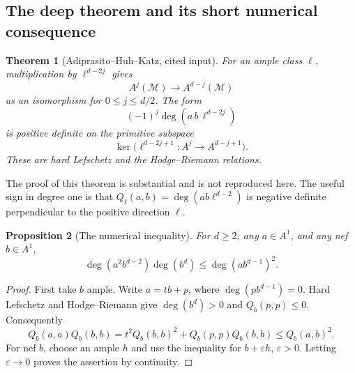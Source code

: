 \documentclass[11pt]{article}
\newtheorem{theorem}{Theorem}[section]
\newtheorem{proposition}[theorem]{Proposition}
\theoremstyle{definition}
\theoremstyle{remark}
\begin{document}
\subsection{The deep theorem and its short numerical consequence}

\begin{theorem}[Adiprasito--Huh--Katz, cited input]\label{thm:gmh-hodge}
For an ample class $\ell$, multiplication by $\ell^{d-2j}$ gives
\[
 A^j(\mathcal M)\longrightarrow A^{d-j}(\mathcal M)
\]
as an isomorphism for $0\le j\le d/2$. The form
\[
 (-1)^j\deg(a\,b\,\ell^{d-2j})
\]
is positive definite on the primitive subspace
\[
 \ker\bigl(\ell^{d-2j+1}:A^j\longrightarrow A^{d-j+1}\bigr).
\]
These are hard Lefschetz and the Hodge--Riemann relations.
\end{theorem}

The proof of this theorem is substantial and is not reproduced here. The useful sign in degree one is that $Q_\ell(a,b)=\deg(ab\ell^{d-2})$ is negative definite perpendicular to the positive direction $\ell$.

\begin{proposition}[The numerical inequality]\label{prop:gmh-hodge-index}
For $d\ge2$, any $a\in A^1$, and any nef $b\in A^1$,
\[
 \deg(a^2b^{d-2})\deg(b^d)
 \le\deg(ab^{d-1})^2.
\]
\end{proposition}
\begin{proof}
First take $b$ ample. Write $a=tb+p$, where $\deg(pb^{d-1})=0$. Hard Lefschetz and Hodge--Riemann give $\deg(b^d)>0$ and $Q_b(p,p)\le0$. Consequently
\[
 Q_b(a,a)Q_b(b,b)
 =t^2Q_b(b,b)^2+Q_b(p,p)Q_b(b,b)
 \le Q_b(a,b)^2.
\]
For nef $b$, choose an ample $h$ and use the inequality for $b+\varepsilon h$, $\varepsilon>0$. Letting $\varepsilon\to0$ proves the assertion by continuity.
\end{proof}
\end{document}
